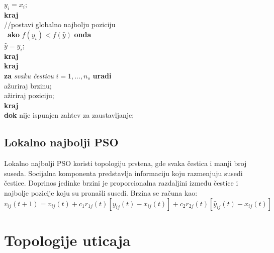 \documentclass[a4paper]{article}
\begin{document}
\hspace*{15mm} $y_i = x_i;$ \\
\hspace*{10mm} \textbf{kraj} \\
\hspace*{5mm}//postavi globalno najbolju poziciju \\\
\hspace*{10mm}\textbf{ako} $f(y_i) < f(\hat{y})$ \textbf{onda} \\
\hspace*{15mm} $\hat{y} = y_i;$ \\
\hspace*{10mm} \textbf{kraj} \\
\hspace*{5mm} \textbf{kraj} \\
\hspace*{5mm} \textbf{za} \textit{svaku česticu} $i = 1,...,n_s$ \textbf{uradi}\\
\hspace*{10mm} ažuriraj brzinu; \\
\hspace*{10mm} ažiriraj poziciju; \\
\hspace*{5mm} \textbf{kraj} \\
\textbf{dok} nije ispunjen zahtev za zaustavljanje;



\subsection{Lokalno najbolji PSO}
\label{subsec:podnaslov2}

Lokalno najbolji PSO koristi topologiju prstena, gde svaka čestica i manji broj suseda. Socijalna komponenta predstavlja informaciju koju razmenjuju susedi čestice. Doprinos jedinke brzini je proporcionalna razdaljini između čestice i najbolje pozicije koju su pronašli susedi. Brzina se računa kao:
\[v_{ij}(t+1) = v_{ij}(t) + c_1r_{1j}(t)[y_{ij}(t) - x_{ij}(t)] + c_2r_{2j}(t)[\hat{y}_{ij}(t) - x_{ij}(t)] \]


\section{Topologije uticaja}
\end{document}
